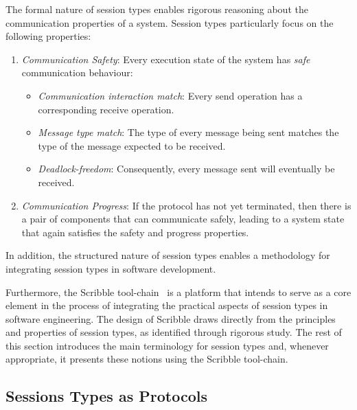 The formal nature of session types enables rigorous
reasoning about the communication properties of a system.
Session types particularly focus on the following properties:
%
\begin{enumerate}[label=$\bullet$]
	\item	{\em Communication Safety}: Every execution state of the system has {\em safe} communication behaviour:
	\begin{itemize}
		\item	{\em Communication interaction match}:
				Every send
				operation has a corresponding receive
				operation.
		\item	{\em Message type match}:
				The type of every message being sent matches the type of the message expected to be received.
		\item	{\em Deadlock-freedom}:
				Consequently, every message sent will eventually be received.
	\end{itemize}
	
	\item	{\em Communication Progress}: If the protocol has not yet terminated, then there is a pair of components that can communicate safely, leading to a system state that again satisfies the safety and progress properties.
\end{enumerate}
%
In addition, the structured nature of session types enables
a methodology for integrating session types in software development.


Furthermore, the Scribble tool-chain~\cite{scribble} is a platform
that intends to serve as a core element in the process
of integrating the practical aspects of session types
in software engineering. The design of Scribble
draws directly from the principles and properties of session types,
as identified through rigorous study. The rest of this
section introduces the main terminology for session types
and, whenever appropriate, it presents these notions
using the Scribble tool-chain.

\subsection{Sessions Types as Protocols}%
\label{sec:sessions_scribble}


